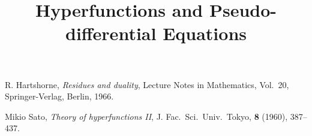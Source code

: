 \documentclass[leqno]{book}
\title{Hyperfunctions and Pseudo-differential Equations}
\author{}
\theoremstyle{plain}
\theoremstyle{definition}
\theoremstyle{remark}
\numberwithin{equation}{section}
\begin{document}
\maketitle

\frontmatter

\tableofcontents
{}


\layout
\mainmatter

%











\backmatter

%
\begin{thebibliography}{20}
    \par
     R. Hartshorne, 
    \textit{Residues and duality}, Lecture Notes in Mathematics, 
    Vol.\ 20, Springer-Verlag, Berlin, 1966.

     Mikio Sato, \textit{Theory of hyperfunctions II}, J. Fac.\ Sci.\ Univ.\ Tokyo, {\bf{8}} (1960), 387--437.

    \end{thebibliography}
\end{document}
